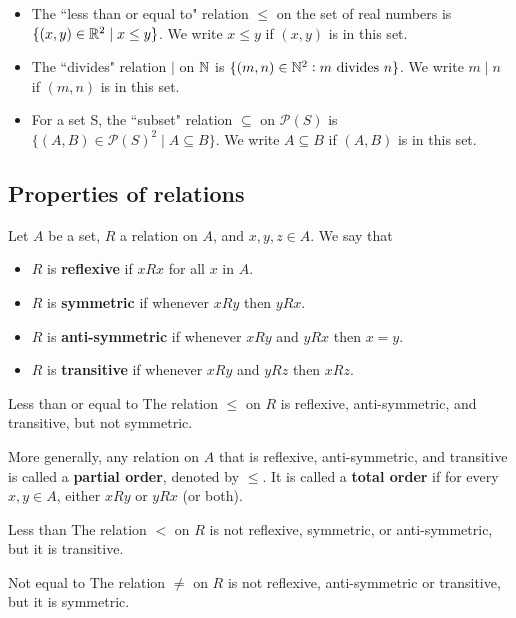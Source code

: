 \begin{exmp}{}{}
\begin{itemize}
\item The ``less than or equal to" relation $\le$ on the set of real numbers is $\{(x,y) \in \mathbb R^2 \mid x \le y\}$. We write $x \le y$ if $(x,y)$ is in this set.
\item The ``divides" relation $\mid$ on $\mathbb N$ is $\{(m,n) \in \mathbb N^2: m \text{ divides } n\}$. We write $m \mid n$ if $(m,n)$ is in this set.
\item For a set S, the ``subset" relation $\subseteq$ on $\mathcal{P}(S)$ is $\{(A,B) \in \mathcal{P}(S)^2 \mid A \subseteq B\}$. We write $A \subseteq B$ if $(A,B)$ is in this set.
\end{itemize}
\end{exmp}
\pagebreak

\subsection{Properties of relations}
Let $A$ be a set, $R$ a relation on $A$, and $x,y,z \in A$. We say that
\begin{itemize}
\item $R$ is \textbf{reflexive} if $xRx$ for all $x$ in $A$.
\item $R$ is \textbf{symmetric} if whenever $xRy$ then $yRx$.
\item $R$ is \textbf{anti-symmetric} if whenever $xRy$ and $yRx$ then $x = y$.
\item $R$ is \textbf{transitive} if whenever $xRy$ and $yRz$ then $xRz$.
\end{itemize}

\begin{exmp}{Less than or equal to}{}
The relation $\le$ on $R$ is reflexive, anti-symmetric, and transitive, but not symmetric. 
\end{exmp}

More generally, any relation on $A$ that is reflexive, anti-symmetric, and transitive is called a \textbf{partial order}, denoted by $\le$. It is called a \textbf{total order} if for every $x, y \in A$, either $xRy$ or $yRx$ (or both).

\begin{exmp}{Less than}{}
The relation $<$ on $R$ is not reflexive, symmetric, or anti-symmetric, but it is transitive.
\end{exmp}

\begin{exmp}{Not equal to}{}
The relation $\neq$ on $R$ is not reflexive, anti-symmetric or transitive, but it is symmetric.
\end{exmp}

